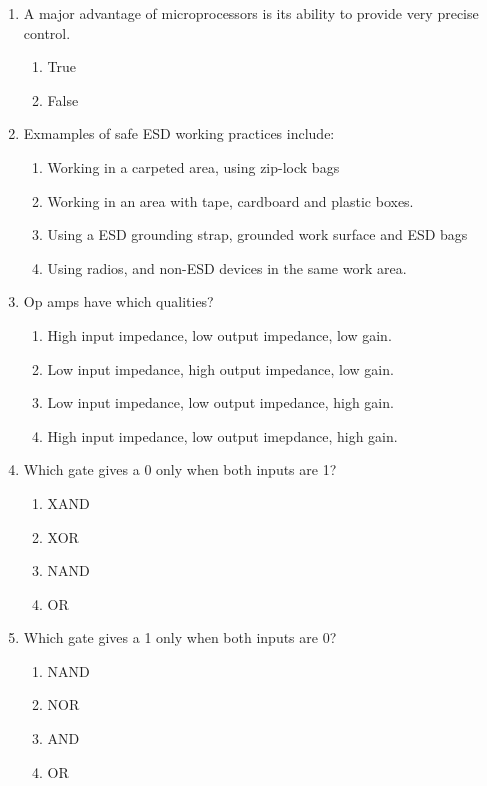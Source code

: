 \documentclass[10pt]{article}
\begin{document}
\begin{multicols}{2}
\begin{enumerate}
\begin{enumerate}
	\end{enumerate}
\item A major advantage of microprocessors is its ability to provide very precise control.
	\begin{enumerate}
	\item True
	\item False
	\end{enumerate}
\item Exmamples of safe ESD working practices include:
	\begin{enumerate}
	\item Working in a carpeted area, using zip-lock bags
	\item Working in an area with tape, cardboard and plastic boxes.
	\item Using a ESD grounding strap, grounded work surface and ESD bags
	\item Using radios, and non-ESD devices in the same work area.
	\end{enumerate}
\item Op amps have which qualities?
	\begin{enumerate}
	\item High input impedance, low output impedance, low gain.
	\item Low input impedance, high output impedance, low gain.
	\item Low input impedance, low output impedance, high gain.
	\item High input impedance, low output imepdance, high gain.
	\end{enumerate}
\item Which gate gives a 0 only when both inputs are 1?
	\begin{enumerate}
	\item XAND
	\item XOR
	\item NAND
	\item OR
	\end{enumerate}
\item Which gate gives a 1 only when both inputs are 0?
	\begin{enumerate}
	\item NAND
	\item NOR
	\item AND
	\item OR
	\end{enumerate}
\end{enumerate}
\end{multicols}
\end{document}
